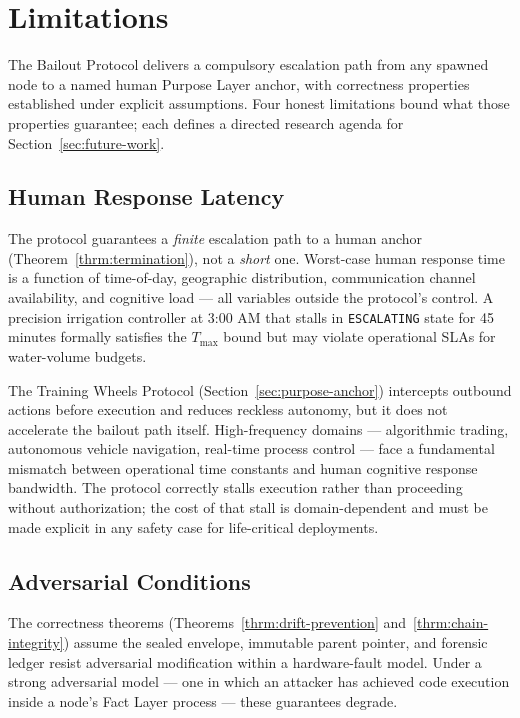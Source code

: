 \section{Limitations}
\label{sec:limitations}

The Bailout Protocol delivers a compulsory escalation path from any spawned node to a named human Purpose Layer anchor, with correctness properties established under explicit assumptions. Four honest limitations bound what those properties guarantee; each defines a directed research agenda for Section~\ref{sec:future-work}.

\subsection{Human Response Latency}
\label{sec:limitations-latency}

The protocol guarantees a \emph{finite} escalation path to a human anchor (Theorem~\ref{thrm:termination}), not a \emph{short} one. Worst-case human response time is a function of time-of-day, geographic distribution, communication channel availability, and cognitive load — all variables outside the protocol's control. A precision irrigation controller at 3:00 AM that stalls in \texttt{ESCALATING} state for 45 minutes formally satisfies the $T_{\max}$ bound but may violate operational SLAs for water-volume budgets.

The Training Wheels Protocol (Section~\ref{sec:purpose-anchor}) intercepts outbound actions before execution and reduces reckless autonomy, but it does not accelerate the bailout path itself. High-frequency domains — algorithmic trading, autonomous vehicle navigation, real-time process control — face a fundamental mismatch between operational time constants and human cognitive response bandwidth. The protocol correctly stalls execution rather than proceeding without authorization; the cost of that stall is domain-dependent and must be made explicit in any safety case for life-critical deployments.

\subsection{Adversarial Conditions}
\label{sec:limitations-adversarial}

The correctness theorems (Theorems~\ref{thrm:drift-prevention} and~\ref{thrm:chain-integrity}) assume the sealed envelope, immutable parent pointer, and forensic ledger resist adversarial modification within a hardware-fault model. Under a strong adversarial model — one in which an attacker has achieved code execution inside a node's Fact Layer process — these guarantees degrade.

